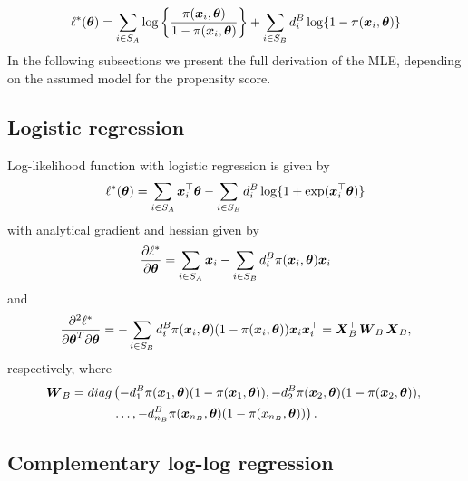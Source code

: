 \documentclass[
  letterpaper,
  DIV=11,
  numbers=noendperiod]{scrreprt}
\begin{document}
\[
\begin{align}
    \ell^{*}(\boldsymbol{\theta}) = \sum_{i \in S_{A}}\log \left\{\frac{\pi(\boldsymbol{x}_{i}, \boldsymbol{\theta})}{1 - \pi(\boldsymbol{x}_{i},\boldsymbol{\theta})}\right\} + \sum_{i \in S_{B}}d_{i}^{B}\log\{1 - \pi({\boldsymbol{x}_{i},\boldsymbol{\theta}})\}
\end{align}
\] In the following subsections we present the full derivation of the
MLE, depending on the assumed model for the propensity score.

\hypertarget{logistic-regression}{%
\subsection{Logistic regression}\label{logistic-regression}}

Log-likelihood function with logistic regression is given by \[
\ell^{*}(\boldsymbol{\theta}) = \sum_{i \in S_A}\boldsymbol{x}_{i}^{\top}\boldsymbol{\theta} - \sum_{i \in S_B}d_{i}^{B}\log\{1 + \exp(\boldsymbol{x}_{i}^{\top}\boldsymbol{\theta})\}
\] with analytical gradient and hessian given by \[
\frac{\partial \ell^*}{\partial\boldsymbol{\theta}} = \sum_{i \in S_{A}}\boldsymbol{x}_{i} - \sum_{i \in S_{B}}d_{i}^{B}\pi(\boldsymbol{x}_{i}, \boldsymbol{\theta})\boldsymbol{x}_{i}
\] and \[
    \frac{\partial^{2} \ell^{*}}{\partial\boldsymbol{\theta}^{T} \partial\boldsymbol{\theta}} =- \sum_{i \in S_B}d_i^B\pi(\boldsymbol{x}_i,\boldsymbol{\theta})(1 - \pi(\boldsymbol{x}_i,\boldsymbol{\theta}))\boldsymbol{x}_i\boldsymbol{x}_i^{\top} = \boldsymbol{X}_B^{\top}\operatorname{\boldsymbol{W}}_{B}\boldsymbol{X}_B,
\] respectively, where \[
\begin{align*}
    \operatorname{\boldsymbol{W}}_{B} =
    diag & \left(-d_1^B\pi(\boldsymbol{x}_{1},\boldsymbol{\theta})(1 - \pi(\boldsymbol{x}_{1},\boldsymbol{\theta})), -d_2^B\pi(\boldsymbol{x}_{2},\boldsymbol{\theta})(1 - \pi(\boldsymbol{x}_{2},\boldsymbol{\theta})), \right. \\
     & \left. \ldots, -d_{n_{B}}^{B}\pi(\boldsymbol{x}_{n_{B}},\boldsymbol{\theta})(1 - \pi(x_{n_{B}},\boldsymbol{\theta}))\right).
\end{align*}
\]

\hypertarget{complementary-log-log-regression}{%
\subsection{Complementary log-log
regression}\label{complementary-log-log-regression}}
\end{document}
